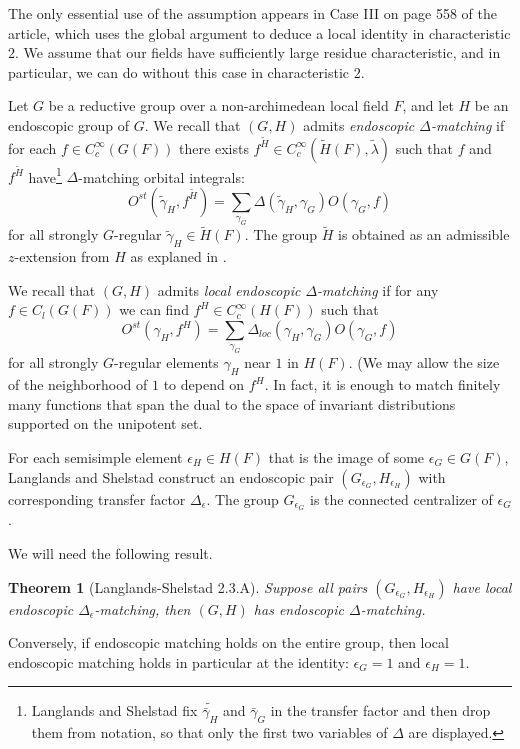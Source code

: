 \documentclass[12pt]{amsart}
\theoremstyle{plain}
\newtheorem{theorem}[thm]{Theorem}
\theoremstyle{definition}
\begin{document}
The only essential use of the assumption appears in Case III on page
558 of the article, which uses the global argument to deduce a local
identity in characteristic $2$.  We assume that our fields have
sufficiently large residue characteristic, and in particular, we can
do without this case in characteristic $2$.

Let $G$ be a reductive group over a non-archimedean local field $F$,
and let $H$ be an endoscopic group of $G$.    We recall \cite[Sec.2.1]{LSd} that $(G,H)$
admits {\it endoscopic $\Delta$-matching} if for each $f\in
C_c^\infty(G(F))$ there exists $f^{\tilde H}\in C_c^\infty(\tilde
H(F),\tilde \lambda)$ such that $f$ and $f^{\tilde H}$
have\footnote{Langlands and Shelstad fix $\tilde{\bar \gamma_H}$ and
  $\bar\gamma_G$ in the transfer factor and then drop them from
  notation, so that only the first two variables of $\Delta$ are displayed.}
$\Delta$-matching orbital integrals:
\[
O^{st}(\tilde \gamma_H,f^{\tilde H}) 
 = \sum_{\gamma_G} \Delta(\tilde\gamma_H,\gamma_G)O(\gamma_G,f)
\]
for all strongly $G$-regular $\tilde \gamma_H \in \tilde H(F)$.
The group $\tilde H$ is obtained as an admissible $z$-extension from
$H$ as explaned in \cite[Sec. 4.4]{LSxf}.

We recall that $(G,H)$ admits {\it local endoscopic $\Delta$-matching}
if for any $f\in C_l(G(F))$ we can find $f^H \in C_c^\infty(H(F))$
such that
\[
O^{st}( \gamma_H,f^{ H}) 
 = \sum_{\gamma_G} \Delta_{loc}(\gamma_H,\gamma_G)O(\gamma_G,f)
\]
for all strongly $G$-regular elements $\gamma_H$ near $1$ in $H(F)$.
(We may allow the size of the neighborhood of $1$ to depend on $f^H$.
In fact, it is enough to match finitely many functions that span the
dual to the space of invariant distributions supported on the
unipotent set.

For each semisimple element $\epsilon_H \in H(F)$ that is the image of
some $\epsilon_G\in G(F)$, Langlands and Shelstad construct an
endoscopic pair $(G_{\epsilon_G},H_{\epsilon_H})$ with corresponding
transfer factor $\Delta_\epsilon$.  The group $G_{\epsilon_G}$ is the
connected centralizer of $\epsilon_G$.

We will need the following result.

\begin{theorem}[Langlands-Shelstad 2.3.A]  Suppose all pairs
  $(G_{\epsilon_G},H_{\epsilon_H})$ have local endoscopic
  $\Delta_\epsilon$-matching, then $(G,H)$ has endoscopic $\Delta$-matching.
\end{theorem}

Conversely, if endoscopic matching holds on the entire group, then
local endoscopic matching holds in particular at the identity:
$\epsilon_G = 1$ and $\epsilon_H =1$.
\end{document}
